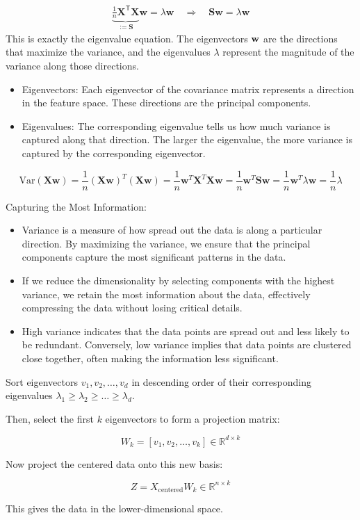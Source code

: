 \begin{align*}
	\underbrace{ \frac{1}{n} \mathbf{X}^\mathsf{T} \mathbf{X} }_{:= \mathbf{S} } \mathbf{w} = \lambda \mathbf{w}  \quad \Rightarrow \quad \mathbf{S} \mathbf{w} = \lambda \mathbf{w}
\end{align*}
This is exactly the eigenvalue equation. The eigenvectors ${\mathbf{w}}$ are the directions that maximize the variance, and the eigenvalues $\lambda$ represent the magnitude of the variance along those directions.

\begin{itemize}
	\item Eigenvectors: Each eigenvector of the covariance matrix represents a direction in the feature space. These directions are the principal components.
	\item Eigenvalues: The corresponding eigenvalue tells us how much variance is captured along that direction. The larger the eigenvalue, the more variance is captured by the corresponding eigenvector.
\end{itemize}

\[
\text{Var}(\mathbf{X}\mathbf{w}) = \frac{1}{n} (\mathbf{X}\mathbf{w})^T (\mathbf{X}\mathbf{w}) = \frac{1}{n} \mathbf{w}^T \mathbf{X}^T \mathbf{X} \mathbf{w} = \frac{1}{n} \mathbf{w}^T \mathbf{S} \mathbf{w} = \frac{1}{n} \mathbf{w}^T \lambda \mathbf{w} = \frac{1}{n} \lambda
\]

Capturing the Most Information:

\begin{itemize}
	\item Variance is a measure of how spread out the data is along a particular direction. By maximizing the variance, we ensure that the principal components capture the most significant patterns in the data.
	\item If we reduce the dimensionality by selecting components with the highest variance, we retain the most information about the data, effectively compressing the data without losing critical details.
	\item High variance indicates that the data points are spread out and less likely to be redundant. Conversely, low variance implies that data points are clustered close together, often making the information less significant.
\end{itemize}

Sort eigenvectors $v_1, v_2, \dots, v_d$ in descending order of their corresponding eigenvalues $\lambda_1 \geq \lambda_2 \geq \dots \geq \lambda_d$.

Then, select the first $k$ eigenvectors to form a projection matrix:

$$
W_k = [v_1, v_2, \dots, v_k] \in \mathbb{R}^{d \times k}
$$

Now project the centered data onto this new basis:

$$
Z = X_{\text{centered}} W_k \in \mathbb{R}^{n \times k}
$$

This gives the data in the lower-dimensional space.


